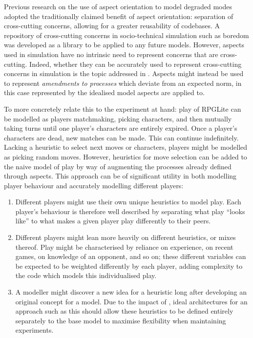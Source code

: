 Previous research on the use of aspect orientation to model degraded modes
adopted the traditionally claimed benefit of aspect orientation: separation of
cross-cutting concerns, allowing for a greater reusability of
codebases\cite{wallis2018caise}. A repository of cross-cutting concerns in
socio-technical simulation such as boredom was developed as a library to be
applied to any future models\cite{fuzzimoss_repo}. However, aspects used in
simulation have no intrinsic need to represent concerns that are cross-cutting.
Indeed, whether they can be accurately used to represent cross-cutting concerns
in simulation is the topic addressed in . Aspects
might instead be used to represent \emph{amendments to processes} which deviate
from an expected norm, in this case represented by the idealised model aspects
are applied to.

To more concretely relate this to the experiment at hand: play of RPGLite can be
modelled as players matchmaking, picking characters, and then mutually taking
turns until one player's characters are entirely expired. Once a player's
characters are dead, new matches can be made. This can continue indefinitely.
Lacking a heuristic to select next moves or characters, players might be
modelled as picking random moves. However, heuristics for move selection can be
added to the naive model of play by way of augmenting the processes already
defined through aspects. This approach can be of significant utility in both
modelling player behaviour and accurately modelling different players:

\begin{enumerate}
    \item Different players might use their own unique heuristics to model play.
    Each player's behaviour is therefore well described by separating what play
    ``looks like'' to what makes a given player play differently to their peers.
    \item Different players might lean more heavily on different heuristics, or
    mixes thereof. Play might be characterised by reliance on experience, on
    recent games, on knowledge of an opponent, and so on; these different
    variables can be expected to be weighted differently by each player, adding
    complexity to the code which models this individualised play.
    \item A modeller might discover a new idea for a heuristic long after
    developing an original concept for a model. Due
    to the impact of , ideal architectures for an approach such as
    this should allow these heuristics to be defined entirely separately to
    the base model to maximise flexibility when maintaining experiments.
\end{enumerate}

